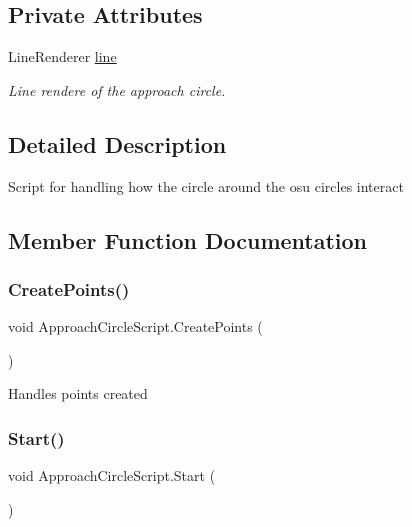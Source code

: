 \subsection*{Private Attributes}
\begin{DoxyCompactItemize}
\item 
\mbox{\label{class_approach_circle_script_a7a863d8532178a5657ee6a81f8d7f620}} 
Line\+Renderer \hyperlink{class_approach_circle_script_a7a863d8532178a5657ee6a81f8d7f620}{line}
\begin{DoxyCompactList}\small\item\em Line rendere of the approach circle. \end{DoxyCompactList}\end{DoxyCompactItemize}


\subsection{Detailed Description}
Script for handling how the circle around the osu circles interact 

\subsection{Member Function Documentation}
\mbox{\label{class_approach_circle_script_af02f62c7e58fbdfba5041a3f8b103faf}} 
\subsubsection{\texorpdfstring{Create\+Points()}{CreatePoints()}}
{\footnotesize\ttfamily void Approach\+Circle\+Script.\+Create\+Points (\begin{DoxyParamCaption}{ }\end{DoxyParamCaption})\hspace{0.3cm}{\ttfamily [private]}}

Handles points created \mbox{\label{class_approach_circle_script_a7fd2d08d8cf97264691ec5801f420dc4}} 
\subsubsection{\texorpdfstring{Start()}{Start()}}
{\footnotesize\ttfamily void Approach\+Circle\+Script.\+Start (\begin{DoxyParamCaption}{ }\end{DoxyParamCaption})\hspace{0.3cm}{\ttfamily [private]}}

